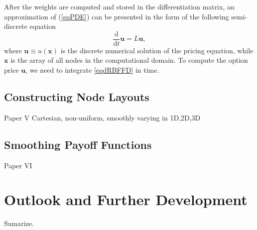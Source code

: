 \documentclass{UUThesisTemplate}
\begin{document}
\par
After the weights are computed and stored in the differentiation matrix, an approximation of (\ref{eqPDE}) can be presented in the form of the following semi-discrete equation
\begin{equation}
\label{eqdRBFFD}
\frac{\mathrm{d}}{\mathrm{d} t}\mathbf{u}=L\mathbf{u},
\end{equation}
where $\mathbf{u}\equiv u(\mathbf{x})$ is the discrete numerical solution of the pricing equation, while $\mathbf{x}$ is the array of all nodes in the computational domain. To compute the option price $\mathbf{u}$, we need to integrate \eqref{eqdRBFFD} in time.
%
\section{Constructing Node Layouts}
Paper V
Cartesian, non-uniform, smoothly varying in 1D,2D,3D
%
\section{Smoothing Payoff Functions}
Paper VI
%
%
\chapter{Outlook and Further Development}
\label{ch:outlook}
Sumarize.

\backmatter
    
    
\end{document}
